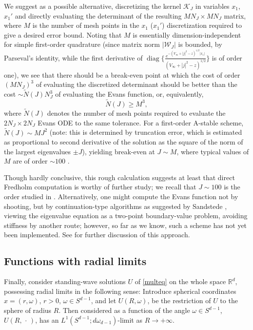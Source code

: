 We suggest as a possible alternative, discretizing the kernel
${{\mathcal K}}_J$ in variables $x_1$, $x_1'$ and directly evaluating the
determinant of the resulting $MN_J\times MN_J$ matrix,
where $M$ is the number of mesh points in the $x_1$ ($x_1'$)
discretization required to give a desired error bound.
Noting that $M$ is essentially dimension-independent for
simple first-order quadrature (since matrix norm $|{{\mathcal W}}_J|$
is bounded, by Parseval's identity, while the first derivative
of $\operatorname{diag} \Big\{ \frac{e^{ -(V_\infty + |j|^2-z)^{1/2}|x_1|}}
{(V_\infty + |j|^2-z)^{1/2}} \Big\}$ is of order one),
we see that there should be a break-even point at which
the cost of order
$(MN_J)^3$ of evaluating the discretized determinant
should be better than the cost $\sim \tilde N(J) N_J^3$ of
evaluating the Evans function, or,
equivalently,
\begin{equation}
\tilde N(J){\geqslant} M^3,
\end{equation}
where $\tilde N(J)$ denotes the number of mesh
points required to evaluate the $2N_J\times 2N_J$ Evans ODE
to the same tolerance.  For a first-order A-stable scheme,
$\tilde N(J)\sim M J^2$ (note: this is determined by truncation error,
which is estimated as proportional to second derivative of the solution
as the square of
the norm of the largest eigenvalues $\pm J$), yielding break-even at
$J\sim M$,
where typical values of $M$ are of order
$\sim 100$ \cite{HZ06}.

Though hardly conclusive, this rough calculation suggests at least
that direct Fredholm computation is worthy of further study; we
recall that $J\sim 100$ is the order studied in \cite{LPSS00}.
Alternatively, one might compute the Evans function not by
shooting, but by continuation-type algorithms
as suggested by Sandstede \cite{Sa99}, viewing
the eigenvalue equation as a two-point boundary-value problem,
avoiding stiffness by another route;
however, so far as we know, such a scheme has not
yet been implemented.
See \cite{HZ06} for further discussion of this approach.

\subsection{Functions with radial limits}\label{rad}
Finally, consider standing-wave solutions $U$ of \eqref{multeq}
on the whole space ${{\mathbb{R}}}^d$, possessing radial limits in the following sense:
Introduce spherical coordinates $x=(r,\omega)$, $r>0$, $\omega\in S^{d-1}$, and let
$U(R,\omega)$, be the restriction of $U$ to the  sphere of radius $R$. Then considered as a
function of the angle $\omega\in S^{d-1}$, $U(R,{\,\cdot\,})$, has an
$L^1(S^{d-1};d\omega_{d-1})$-limit as $R\to +\infty$.

